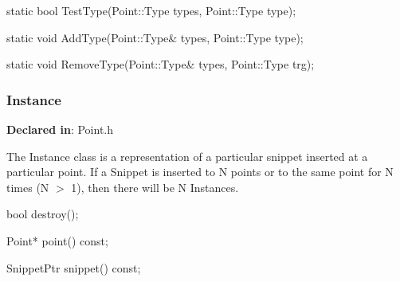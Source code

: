 
\begin{apient}
static bool TestType(Point::Type types, Point::Type type);
\end{apient}



\begin{apient}
static void AddType(Point::Type& types, Point::Type type);
\end{apient}



\begin{apient}
static void RemoveType(Point::Type& types, Point::Type trg);
\end{apient}



\subsubsection{Instance}
\label{sec-3.1.3}

\textbf{Declared in}: Point.h

The Instance class is a representation of a particular snippet inserted at a
particular point. If a Snippet is inserted to N points or to the same point for
N times (N $>$ 1), then there will be N Instances.


\begin{apient}
bool destroy();
\end{apient}



\begin{apient}
Point* point() const;
\end{apient}



\begin{apient}
SnippetPtr snippet() const;
\end{apient}



